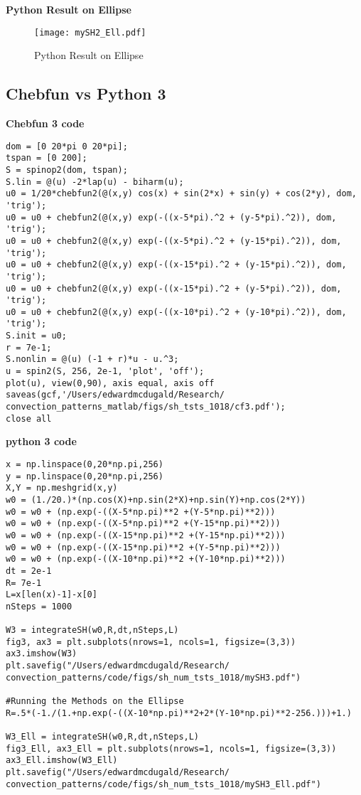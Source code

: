 \documentclass[12pt]{article}
\begin{document}
\textbf{Python Result on Ellipse}
\begin{figure}[ht]
        \centering
        \texttt{[image: mySH2\_Ell.pdf]}
        \label{fig:1}
        \caption{Python Result on Ellipse}
\end{figure}
\FloatBarrier

\subsection{Chebfun vs Python 3}
\textbf{Chebfun 3 code}
\begin{verbatim}
dom = [0 20*pi 0 20*pi];
tspan = [0 200];
S = spinop2(dom, tspan);
S.lin = @(u) -2*lap(u) - biharm(u);
u0 = 1/20*chebfun2(@(x,y) cos(x) + sin(2*x) + sin(y) + cos(2*y), dom, 'trig');
u0 = u0 + chebfun2(@(x,y) exp(-((x-5*pi).^2 + (y-5*pi).^2)), dom, 'trig');
u0 = u0 + chebfun2(@(x,y) exp(-((x-5*pi).^2 + (y-15*pi).^2)), dom, 'trig');
u0 = u0 + chebfun2(@(x,y) exp(-((x-15*pi).^2 + (y-15*pi).^2)), dom, 'trig');
u0 = u0 + chebfun2(@(x,y) exp(-((x-15*pi).^2 + (y-5*pi).^2)), dom, 'trig');
u0 = u0 + chebfun2(@(x,y) exp(-((x-10*pi).^2 + (y-10*pi).^2)), dom, 'trig');
S.init = u0;
r = 7e-1;
S.nonlin = @(u) (-1 + r)*u - u.^3;
u = spin2(S, 256, 2e-1, 'plot', 'off');
plot(u), view(0,90), axis equal, axis off
saveas(gcf,'/Users/edwardmcdugald/Research/
convection_patterns_matlab/figs/sh_tsts_1018/cf3.pdf');
close all
\end{verbatim}

\textbf{python 3 code}
\begin{verbatim}
x = np.linspace(0,20*np.pi,256)
y = np.linspace(0,20*np.pi,256)
X,Y = np.meshgrid(x,y)
w0 = (1./20.)*(np.cos(X)+np.sin(2*X)+np.sin(Y)+np.cos(2*Y))
w0 = w0 + (np.exp(-((X-5*np.pi)**2 +(Y-5*np.pi)**2)))
w0 = w0 + (np.exp(-((X-5*np.pi)**2 +(Y-15*np.pi)**2)))
w0 = w0 + (np.exp(-((X-15*np.pi)**2 +(Y-15*np.pi)**2)))
w0 = w0 + (np.exp(-((X-15*np.pi)**2 +(Y-5*np.pi)**2)))
w0 = w0 + (np.exp(-((X-10*np.pi)**2 +(Y-10*np.pi)**2)))
dt = 2e-1
R= 7e-1
L=x[len(x)-1]-x[0]
nSteps = 1000

W3 = integrateSH(w0,R,dt,nSteps,L)
fig3, ax3 = plt.subplots(nrows=1, ncols=1, figsize=(3,3))
ax3.imshow(W3)
plt.savefig("/Users/edwardmcdugald/Research/
convection_patterns/code/figs/sh_num_tsts_1018/mySH3.pdf")

#Running the Methods on the Ellipse
R=.5*(-1./(1.+np.exp(-((X-10*np.pi)**2+2*(Y-10*np.pi)**2-256.)))+1.)

W3_Ell = integrateSH(w0,R,dt,nSteps,L)
fig3_Ell, ax3_Ell = plt.subplots(nrows=1, ncols=1, figsize=(3,3))
ax3_Ell.imshow(W3_Ell)
plt.savefig("/Users/edwardmcdugald/Research/
convection_patterns/code/figs/sh_num_tsts_1018/mySH3_Ell.pdf")
\end{verbatim}
\FloatBarrier
\end{document}
